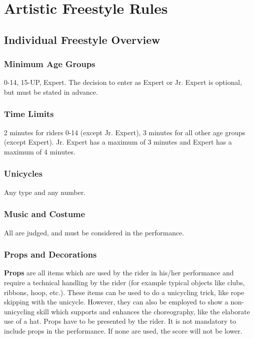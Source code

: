 \chapter{Artistic Freestyle Rules}

\section{Individual Freestyle Overview}

\subsection{Minimum Age Groups}
0-14, 15-UP, Expert.
The decision to enter as Expert or Jr. Expert is optional, but must be stated in advance.

\subsection{Time Limits}
2 minutes for riders 0-14 (except Jr. Expert), 3 minutes for all other age groups (except Expert).
Jr. Expert has a maximum of 3 minutes and Expert has a maximum of 4 minutes.

\subsection{Unicycles}
Any type and any number.

\subsection{Music and Costume}
All are judged, and must be considered in the performance.

\subsection{Props and Decorations \label{subsec:freestyle_freestyle-rules_individual-freestyle-overview_props-and-decorations}}

\textbf{Props} are all items which are used by the rider in his/her performance and require a technical handling by the rider (for example typical objects like clubs, ribbons, hoop, etc.).
These items can be used to do a unicycling trick, like rope skipping with the unicycle.
However, they can also be employed to show a non-unicycling skill which supports and enhances the choreography, like the elaborate use of a hat.
Props have to be presented by the rider.
It is not mandatory to include props in the performance.
If none are used, the score will not be lower.

